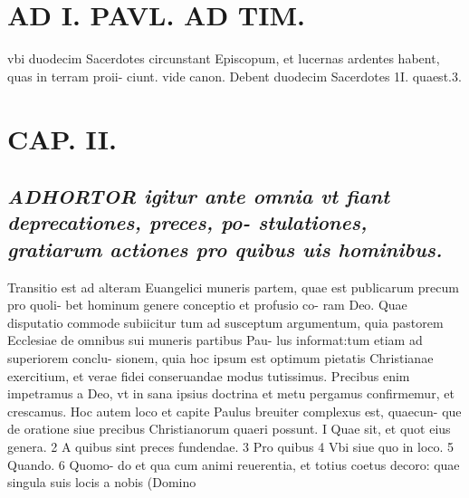 \documentclass{article}
\begin{document}
\begin{pages}
\section*{AD I. PAVL. AD TIM. }
\marginpar{[ p.38 ]}\pstart vbi duodecim Sacerdotes circunstant Episcopum, et lucernas ardentes habent, quas in terram proii- ciunt. vide canon. Debent duodecim Sacerdotes 1I. quaest.3.  \pend
\endnumbering\beginnumbering\section{CAP. II.}
{}
\subsection*{\textit{\huge\textbf{A}\normalsize DHORTOR igitur ante omnia vt fiant deprecationes, preces, po- stulationes, gratiarum actiones pro quibus uis hominibus. }}\pstart Transitio est ad alteram Euangelici muneris partem, quae est publicarum precum pro quoli- bet hominum genere conceptio et profusio co- ram Deo. Quae disputatio commode subiicitur tum ad susceptum argumentum, quia pastorem Ecclesiae de omnibus sui muneris partibus Pau- lus informat:tum etiam ad superiorem conclu- sionem, quia hoc ipsum est optimum pietatis Christianae exercitium, et verae fidei conseruandae modus tutissimus. Precibus enim impetramus a Deo, vt in sana ipsius doctrina et metu pergamus confirmemur, et crescamus. Hoc autem loco et capite Paulus breuiter complexus est, quaecun- que de oratione siue precibus Christianorum quaeri possunt. I Quae sit, et quot eius genera. 2 A quibus sint preces fundendae. 3 Pro quibus 4 Vbi siue quo in loco. 5 Quando. 6 Quomo- do et qua cum animi reuerentia, et totius coetus decoro: quae singula suis locis a nobis (Domino  \pend

\end{pages}
\end{document}
